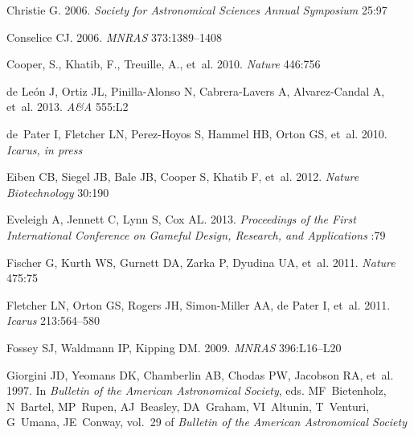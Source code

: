 \documentclass{ar2e}
\def\aap{A{\&}A}
\def\mnras{MNRAS}
\begin{document}
\begin{thebibliography}{}
{Christie} G. 2006.
\newblock \textit{Society for Astronomical Sciences Annual Symposium} 25:97

{Conselice} CJ. 2006.
\newblock \textit{\mnras} 373:1389--1408

{Cooper}, S., {Khatib}, F., {Treuille}, A., {et~al.} 2010.
\newblock \textit{Nature} 446:756

{de Le{\'o}n} J, {Ortiz} JL, {Pinilla-Alonso} N, {Cabrera-Lavers} A,
  {Alvarez-Candal} A, et~al. 2013.
\newblock \textit{\aap} 555:L2

de~Pater I, Fletcher LN, Perez-Hoyos S, Hammel HB, Orton GS, et~al. 2010.
\newblock \textit{Icarus, in press}

{Eiben} CB, {Siegel} JB, {Bale} JB, {Cooper} S, {Khatib} F, et~al. 2012.
\newblock \textit{{Nature Biotechnology}} 30:190

{Eveleigh} A, {Jennett} C, {Lynn} S, {Cox} AL. 2013.
\newblock \textit{{Proceedings of the First International Conference on Gameful
  Design, Research, and Applications}} :79

{Fischer} G, {Kurth} WS, {Gurnett} DA, {Zarka} P, {Dyudina} UA, et~al. 2011.
\newblock \textit{{Nature}} 475:75

{Fletcher} LN, {Orton} GS, {Rogers} JH, {Simon-Miller} AA, {de Pater} I, et~al.
  2011.
\newblock \textit{Icarus} 213:564--580

{Fossey} SJ, {Waldmann} IP, {Kipping} DM. 2009.
\newblock \textit{\mnras} 396:L16--L20

{Giorgini} JD, {Yeomans} DK, {Chamberlin} AB, {Chodas} PW, {Jacobson} RA,
  et~al. 1997.
\newblock In \textit{Bulletin of the American Astronomical Society}, eds.
  MF~{Bietenholz}, N~{Bartel}, MP~{Rupen}, AJ~{Beasley}, DA~{Graham},
  VI~{Altunin}, T~{Venturi}, G~{Umana}, JE~{Conway}, vol.~29 of
  \textit{Bulletin of the American Astronomical Society}


\end{thebibliography}
\end{document}
